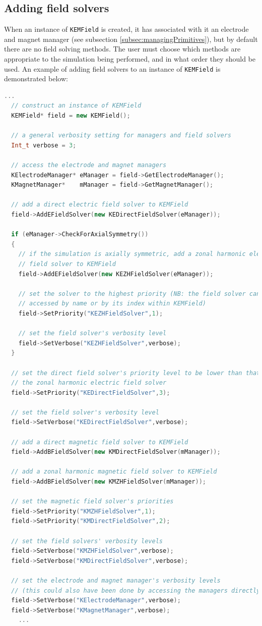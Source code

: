 \documentclass[11pt,a4paper,oneside]{article}
\begin{document}
\subsection{Adding field solvers}
\label{subsec:addingFieldSolvers}

When an instance of \texttt{KEMField} is created, it has associated with it an electrode and magnet manager (see subsection \ref{subsec:managingPrimitives}), but by default there are no field solving methods.  The user must choose which methods are appropriate to the simulation being performed, and in what order they should be used.  An example of adding field solvers to an instance of \texttt{KEMField} is demonstrated below:
%
\begin{lstlisting}[language=C++]
  ...
  // construct an instance of KEMField
  KEMField* field = new KEMField();
  
  // a general verbosity setting for managers and field solvers
  Int_t verbose = 3;
  
  // access the electrode and magnet managers
  KElectrodeManager* eManager = field->GetElectrodeManager();
  KMagnetManager*    mManager = field->GetMagnetManager();
  
  // add a direct electric field solver to KEMField
  field->AddEFieldSolver(new KEDirectFieldSolver(eManager));

  if (eManager->CheckForAxialSymmetry())
  {
    // if the simulation is axially symmetric, add a zonal harmonic electric
    // field solver to KEMField
    field->AddEFieldSolver(new KEZHFieldSolver(eManager));

    // set the solver to the highest priority (NB: the field solver can be
    // accessed by name or by its index within KEMField)
    field->SetPriority("KEZHFieldSolver",1);
    
    // set the field solver's verbosity level
    field->SetVerbose("KEZHFieldSolver",verbose);
  }
    
  // set the direct field solver's priority level to be lower than that of
  // the zonal harmonic electric field solver
  field->SetPriority("KEDirectFieldSolver",3);
  
  // set the field solver's verbosity level
  field->SetVerbose("KEDirectFieldSolver",verbose);

  // add a direct magnetic field solver to KEMField
  field->AddBFieldSolver(new KMDirectFieldSolver(mManager));
  
  // add a zonal harmonic magnetic field solver to KEMField
  field->AddBFieldSolver(new KMZHFieldSolver(mManager));
  
  // set the magnetic field solver's priorities
  field->SetPriority("KMZHFieldSolver",1);
  field->SetPriority("KMDirectFieldSolver",2);

  // set the field solvers' verbosity levels
  field->SetVerbose("KMZHFieldSolver",verbose);
  field->SetVerbose("KMDirectFieldSolver",verbose);
  
  // set the electrode and magnet manager's verbosity levels
  // (this could also have been done by accessing the managers directly)
  field->SetVerbose("KElectrodeManager",verbose);
  field->SetVerbose("KMagnetManager",verbose);
    ...
\end{lstlisting}
\end{document}
